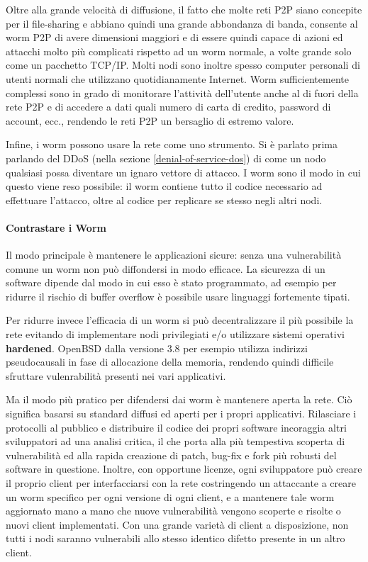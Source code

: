 Oltre alla grande velocità di diffusione, il fatto che molte reti P2P siano concepite per il file-sharing e abbiano quindi una grande abbondanza di banda, consente al worm P2P di avere dimensioni maggiori e di essere quindi capace di azioni ed attacchi molto più complicati rispetto ad un worm normale, a volte grande solo come un pacchetto TCP/IP. Molti nodi sono inoltre spesso computer personali di utenti normali che utilizzano quotidianamente Internet. Worm sufficientemente complessi sono in grado di monitorare l'attività dell'utente anche al di fuori della rete P2P e di accedere a dati quali numero di carta di credito, password di account, ecc., rendendo le reti P2P un bersaglio di estremo valore.

Infine, i worm possono usare la rete come uno strumento. Si è parlato prima parlando del DDoS (nella sezione \ref{denial-of-service-dos}) di come un nodo qualsiasi possa diventare un ignaro vettore di attacco. I worm sono il modo in cui questo viene reso possibile: il worm contiene tutto il codice necessario ad effettuare l'attacco, oltre al codice per replicare se stesso negli altri nodi.

\paragraph{Contrastare i Worm}\label{contrastare-i-worm}

Il modo principale è mantenere le applicazioni sicure: senza una vulnerabilità comune un worm non può diffondersi in modo efficace. La sicurezza di un software dipende dal modo in cui esso è stato programmato, ad esempio per ridurre il rischio di buffer overflow è possibile usare linguaggi fortemente tipati.

Per ridurre invece l'efficacia di un worm si può decentralizzare il più possibile la rete evitando di implementare nodi privilegiati e/o utilizzare sistemi operativi \textbf{hardened}. OpenBSD dalla versione 3.8 per esempio utilizza indirizzi pseudocausali in fase di allocazione della memoria, rendendo quindi difficile sfruttare vulenrabilità presenti nei vari applicativi.

Ma il modo più pratico per difendersi dai worm è mantenere aperta la rete. Ciò significa basarsi su standard diffusi ed aperti per i propri applicativi. Rilasciare i protocolli al pubblico e distribuire il codice dei propri software incoraggia altri sviluppatori ad una analisi critica, il che porta alla più tempestiva scoperta di vulnerabilità ed alla rapida creazione di patch, bug-fix e fork più robusti del software in questione. Inoltre, con opportune licenze, ogni sviluppatore può creare il proprio client per interfacciarsi con la rete costringendo un attaccante a creare un worm specifico per ogni versione di ogni client, e a mantenere tale worm aggiornato mano a mano che nuove vulnerabilità vengono scoperte e risolte o nuovi client implementati. Con una grande varietà di client a disposizione, non tutti i nodi saranno vulnerabili allo stesso identico difetto presente in un altro client.

